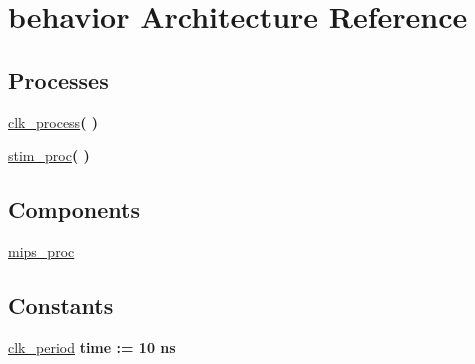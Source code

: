 \hypertarget{classmips__proc__tb_1_1behavior}{\section{behavior \-Architecture \-Reference}
\label{classmips__proc__tb_1_1behavior}
}
\*
\*
\subsection*{\-Processes}
 \begin{DoxyCompactItemize}
\item 
\hypertarget{classmips__proc__tb_1_1behavior_ac5bb218131b813f7908ec89476b31fca}{\hyperlink{classmips__proc__tb_1_1behavior_ac5bb218131b813f7908ec89476b31fca}{clk\-\_\-process}{\bfseries  (  )}}\label{classmips__proc__tb_1_1behavior_ac5bb218131b813f7908ec89476b31fca}

\item 
\hypertarget{classmips__proc__tb_1_1behavior_ad2efa6785cff833c341e27596b21aeb5}{\hyperlink{classmips__proc__tb_1_1behavior_ad2efa6785cff833c341e27596b21aeb5}{stim\-\_\-proc}{\bfseries  (  )}}\label{classmips__proc__tb_1_1behavior_ad2efa6785cff833c341e27596b21aeb5}

\end{DoxyCompactItemize}
\subsection*{\-Components}
 \begin{DoxyCompactItemize}
\item 
\hypertarget{classmips__proc__tb_1_1behavior_aade1eeda70a966f797de9864493345a7}{\hyperlink{classmips__proc__tb_1_1behavior_aade1eeda70a966f797de9864493345a7}{mips\-\_\-proc}  {\bfseries }  }\label{classmips__proc__tb_1_1behavior_aade1eeda70a966f797de9864493345a7}

\end{DoxyCompactItemize}
\subsection*{\-Constants}
 \begin{DoxyCompactItemize}
\item 
\hypertarget{classmips__proc__tb_1_1behavior_a5f1272460f402ee58f04009a62af525e}{\hyperlink{classmips__proc__tb_1_1behavior_a5f1272460f402ee58f04009a62af525e}{clk\-\_\-period} {\bfseries time  \-:=  10  ns } }\label{classmips__proc__tb_1_1behavior_a5f1272460f402ee58f04009a62af525e}

\end{DoxyCompactItemize}
